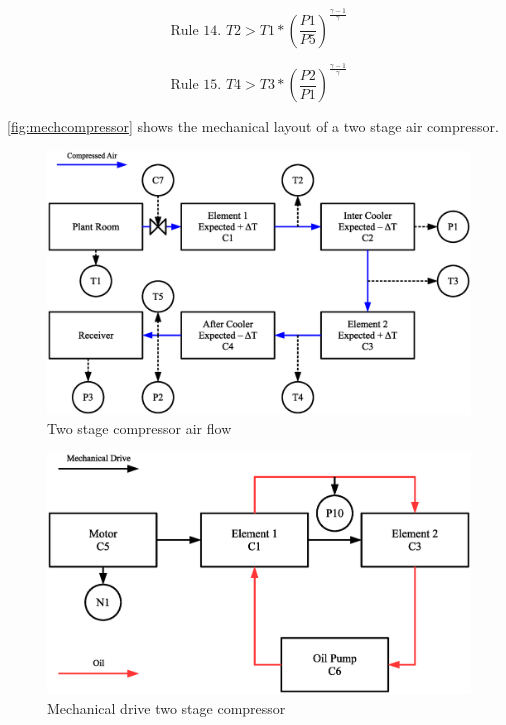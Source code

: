 \begin{equation}
\text{Rule 14. } T2 > T1 * \left(\frac{P1}{P5}\right)^\frac{\gamma-1}{\gamma}
\label{eq:rule14}
\end{equation}

\begin{equation}
\text{Rule 15. } T4 > T3 * \left(\frac{P2}{P1}\right)^\frac{\gamma-1}{\gamma}
\label{eq:rule15}
\end{equation}

\lipsum[1-10]

\autoref{fig:mechcompressor} shows the mechanical layout of a two stage air compressor.

\begin{figure}
\includegraphics[width = \textwidth]{./Images/2StageRotaryCompressorIdeal.eps}
\caption{Two stage compressor air flow}
\label{fig:compairflow}
\end{figure}


\begin{figure}
\includegraphics[width = \textwidth]{./Images/MechanicalCompressor.eps}
\caption{Mechanical drive two stage compressor}
\label{fig:mechcompressor}
\end{figure}

